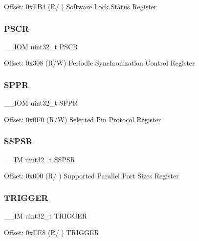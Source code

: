 Offset\+: 0x\+F\+B4 (R/ ) Software Lock Status Register \mbox{\label{struct_t_p_i___type_a3fbc5c84a2a24bd6195e970ff8898024}} 
\subsubsection{\texorpdfstring{PSCR}{PSCR}}
{\footnotesize\ttfamily \+\_\+\+\_\+\+I\+OM uint32\+\_\+t P\+S\+CR}

Offset\+: 0x308 (R/W) Periodic Synchronization Control Register \mbox{\label{struct_t_p_i___type_ae9673e1acb75a46ed9852fd7a557cb7d}} 
\subsubsection{\texorpdfstring{SPPR}{SPPR}}
{\footnotesize\ttfamily \+\_\+\+\_\+\+I\+OM uint32\+\_\+t S\+P\+PR}

Offset\+: 0x0\+F0 (R/W) Selected Pin Protocol Register \mbox{\label{struct_t_p_i___type_a1585b32a1ab860d0d77803475d08c7c6}} 
\subsubsection{\texorpdfstring{SSPSR}{SSPSR}}
{\footnotesize\ttfamily \+\_\+\+\_\+\+IM uint32\+\_\+t S\+S\+P\+SR}

Offset\+: 0x000 (R/ ) Supported Parallel Port Sizes Register \mbox{\label{struct_t_p_i___type_a5590387d8f44b477fd69951a737b0d7e}} 
\subsubsection{\texorpdfstring{TRIGGER}{TRIGGER}}
{\footnotesize\ttfamily \+\_\+\+\_\+\+IM uint32\+\_\+t T\+R\+I\+G\+G\+ER}

Offset\+: 0x\+E\+E8 (R/ ) T\+R\+I\+G\+G\+ER \mbox{\label{struct_t_p_i___type_aee6e8f4171b9024d763ba87f3ce92e73}} 
